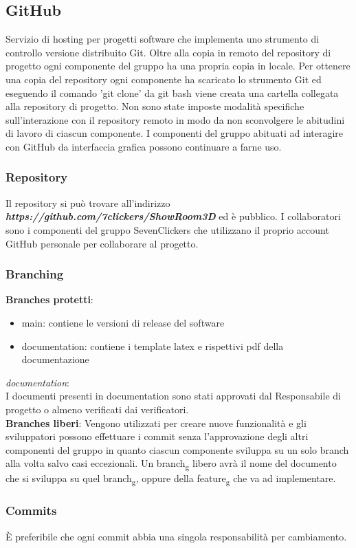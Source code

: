 \subsection{GitHub}
Servizio di hosting per progetti software che implementa uno strumento di controllo versione distribuito Git.
Oltre alla copia in remoto del repository di progetto ogni componente del gruppo ha una propria copia in locale.
Per ottenere una copia del repository ogni componente ha scaricato lo strumento Git ed eseguendo il 
comando 'git clone' da git bash viene creata una cartella collegata alla repository di progetto.
Non sono state imposte modalità specifiche sull'interazione con il repository remoto in modo da non sconvolgere le abitudini di lavoro di 
ciascun componente.
I componenti del gruppo abituati ad interagire con GitHub da interfaccia grafica possono continuare a farne uso.
\subsubsection{Repository}
Il repository si può trovare all'indirizzo \textbf{\textit{https://github.com/7clickers/ShowRoom3D}} ed è pubblico. 
I collaboratori sono i componenti del gruppo SevenClickers che utilizzano il proprio account GitHub personale per collaborare al progetto.
\subsubsection{Branching}
\textbf{Branches protetti}:
    \begin{itemize} 
        \item main: contiene le versioni di release del software
        \item documentation: contiene i template latex e rispettivi pdf della documentazione
    \end{itemize}
\textit{documentation}:\\
I documenti presenti in documentation sono stati approvati dal Responsabile di progetto o almeno verificati dai verificatori.\\
\textbf{Branches liberi}: 
Vengono utilizzati per creare nuove funzionalità e gli sviluppatori possono effettuare i commit senza l'approvazione degli altri componenti del gruppo
in quanto ciascun componente sviluppa su un solo branch alla volta salvo casi eccezionali.
Un branch\textsubscript{g} libero avrà il nome del documento che si sviluppa su quel branch\textsubscript{g}, oppure della feature\textsubscript{g} che va ad implementare.
\subsubsection{Commits}
È preferibile che ogni commit abbia una singola responsabilità per cambiamento.

